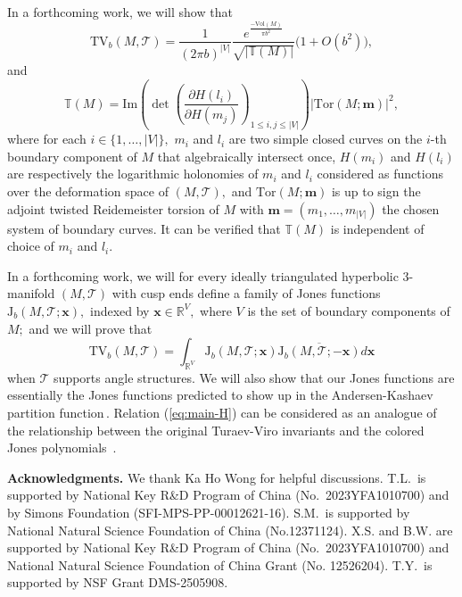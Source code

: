 \documentclass[11pt]{article}
\theoremstyle{remark}
\theoremstyle{remark}
\numberwithin{equation}{section}
\begin{document}
\bigskip
In a forthcoming work, we will show that 
$$\mathrm{TV}_{b}(M, \mathcal T)=\frac{1}{(2\pi b)^{|V|}}\frac{e^{\frac{-\mathrm{Vol}(M)}{\pi b^2}}}{\sqrt{|\mathbb T(M)|}}\big(1+O(b^{2})\big),$$
and
$$\mathbb T(M)=\mathrm{Im}\left(\det\left(\frac{\partial H(l_{i})}{\partial H(m_{j})}\right)_{1\leqslant i, j\leqslant  |V|}\right)\big|\mathrm{Tor}(M;\boldsymbol m)\big|^{2},$$ 
where for each $i\in \{1,\dots, |V|\},$ $m_{i}$ and $l_{i}$ are two simple closed curves on the $i$-th boundary component of $M$ that algebraically intersect once, $H(m_{i})$ and $H(l_{i})$ are respectively the logarithmic holonomies of $m_{i}$ and $l_{i}$ considered as functions over the deformation space of $(M, \mathcal{T}),$ and $\mathrm{Tor}(M; \boldsymbol m)$ is up to sign the adjoint twisted Reidemeister torsion of $M$ with $\boldsymbol m=(m_1,\dots,m_{|V|})$ the chosen system of  boundary curves. It can be verified that $\mathbb T(M)$ is independent of choice of $m_{i}$ and $l_{i}.$ 




\bigskip


 In a forthcoming work, we will  for every ideally triangulated hyperbolic 3-manifold $ (M,\mathcal T)$  with cusp ends  define a family of Jones functions $\mathrm{J}_{b}(M,\mathcal T; \boldsymbol x),$ indexed by $\boldsymbol x\in\mathbb R^V,$ where $V$ is the set of boundary components of $M;$  and we will prove that 
\begin{equation}\label{eq:main-H}
 \mathrm{TV}_b(M,\mathcal{T})
 =
 \int_{\mathbb R^V}
 \mathrm{J}_{b}(M,\mathcal T; \boldsymbol x)
 \overline{\mathrm{J}_{b}(M,\mathcal T; -\boldsymbol x)}
 d\boldsymbol x
\end{equation}
when $\mathcal T$ supports angle structures. 
We will also show that our Jones functions are  essentially the Jones functions  predicted to show up in the Andersen-Kashaev partition function\,\cite{AndersenKashaev, BW}. Relation (\ref{eq:main-H}) can be considered as an analogue of the relationship between the original Turaev-Viro invariants and the colored Jones polynomials~\cite{DetcherryKalfagianniYang, BDKY}.



\bigskip

\noindent\textbf{Acknowledgments.} We thank Ka Ho Wong for helpful discussions. T.L.\ is supported by National Key R\&D Program of China (No.\ 2023YFA1010700) and by Simons Foundation  (SFI-MPS-PP-00012621-16).
S.M.\ is supported by National Natural Science Foundation of China (No.12371124).
X.S. and B.W. are supported by National Key R\&D Program of China (No.\ 2023YFA1010700) and National Natural Science Foundation of China Grant (No. 12526204).
 T.Y.\ is supported by NSF Grant  DMS-2505908. 
\end{document}
